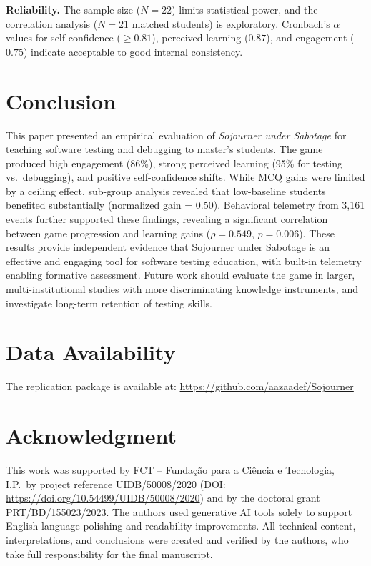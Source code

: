 \documentclass[conference]{IEEEtran}
\begin{document}
\textbf{Reliability.}
The sample size ($N = 22$) limits statistical power, and the correlation analysis ($N = 21$ matched students) is exploratory.
Cronbach's $\alpha$ values for self-confidence ($\geq 0.81$), perceived learning ($0.87$), and engagement ($0.75$) indicate acceptable to good internal consistency.

\section{Conclusion}
\label{sec:conclusion}

This paper presented an empirical evaluation of \emph{Sojourner under Sabotage} for teaching software testing and debugging to master's students.
The game produced high engagement (86\%), strong perceived learning (95\% for testing vs.\ debugging), and positive self-confidence shifts.
While MCQ gains were limited by a ceiling effect, sub-group analysis revealed that low-baseline students benefited substantially (normalized gain = 0.50).
Behavioral telemetry from 3,161 events further supported these findings, revealing a significant correlation between game progression and learning gains ($\rho = 0.549$, $p = 0.006$).
These results provide independent evidence that Sojourner under Sabotage is an effective and engaging tool for software testing education, with built-in telemetry enabling formative assessment.
Future work should evaluate the game in larger, multi-institutional studies with more discriminating knowledge instruments, and investigate long-term retention of testing skills.

\section*{Data Availability}
The replication package is available at: \url{https://github.com/aazaadef/Sojourner}
\section*{Acknowledgment}
This work was supported by FCT -- Funda\c{c}\~{a}o para a Ci\^{e}ncia e Tecnologia, I.P.\ by project reference UIDB/50008/2020 (DOI: \url{https://doi.org/10.54499/UIDB/50008/2020}) and by the doctoral grant PRT/BD/155023/2023.
The authors used generative AI tools solely to support English language polishing and readability improvements.
All technical content, interpretations, and conclusions were created and verified by the authors, who take full responsibility for the final manuscript.
\end{document}
